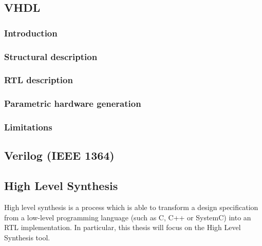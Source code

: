\subsection{\gls{VHDL}}
\label{vhdl}

\subsubsection{Introduction}
\label{vhdl:introduction}

\subsubsection{Structural description}
\label{vhdl:structuralDescription}

\subsubsection{\gls{RTL} description}
\label{vhdl:rtlDescription}

\subsubsection{Parametric hardware generation}
\label{vhdl:parametricHardwareGeneration}

\subsubsection{Limitations}
\label{vhdl:limitations}

\subsection{Verilog (IEEE 1364)}
\label{verilog}

\subsection{High Level Synthesis}
\label{hls}
High level synthesis is a process which is able to transform a design
specification from a low-level programming language (such as C, C++ or SystemC)
into an \gls{RTL} implementation. In particular, this thesis will focus on the
 High Level Synthesis tool.

